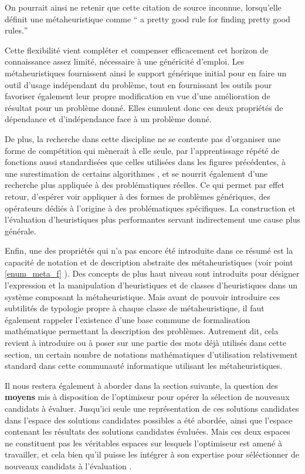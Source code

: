 On pourrait ainsi ne retenir que cette citation de source inconnue, lorsqu'elle définit une métaheuristique comme \foreignquote{english}{ a pretty good rule for finding pretty good rules.}

Cette flexibilité vient compléter et compenser efficacement cet horizon de connaissance assez limité, nécessaire à une généricité d'emploi. Les métaheuristiques fournissent ainsi le support générique initial pour en faire un outil d'usage indépendant du problème, tout en fournissant les outils pour favoriser également leur propre modification en vue d'une amélioration de résultat pour un problème donné. Elles cumulent donc ces deux propriétés de dépendance et d'indépendance face à un problème donné.

De plus, la recherche dans cette discipline ne se contente pas d'organiser une forme de compétition qui mènerait à elle seule, par l'apprentissage répété de fonctions aussi standardisées que celles utilisées dans les figures précédentes, à une surestimation de certains algorithmes , et se nourrit également d'une recherche plus appliquée à des problématiques réelles. Ce qui permet par effet retour, d'espérer voir appliquer à des formes de problèmes génériques, des opérateurs dédiés à l'origine à des problématiques spécifiques. La construction et l'évaluation d'heuristiques plus performantes servant indirectement une cause plus générale.

Enfin, une des propriétés qui n'a pas encore été introduite dans ce résumé est la capacité de notation et de description abstraite des métaheuristiques (voir point \ref{enum_meta_f} ). Des concepts de plus haut niveau sont introduits pour désigner l'expression et la manipulation d'heuristiques et de classes d'heuristiques dans un système composant la métaheuristique. Mais avant de pouvoir introduire ces subtilités de typologie propre à chaque classe de métaheuristique, il faut également rappeler l'existence d'une base commune de formalisation mathématique permettant la description des problèmes. Autrement dit, cela revient à introduire ou à poser sur une partie des mots déjà utilisés dans cette section, un certain nombre de notations mathématiques d'utilisation relativement standard dans cette communauté informatique utilisant les métaheuristiques.

Il nous restera également à aborder dans la section suivante, la question des \textbf{moyens} mis à disposition de l'optimiseur pour opérer la sélection de nouveaux candidats à évaluer. Jusqu'ici seule une représentation de ces solutions candidates dans l'espace des solutions candidates possibles a été abordée, ainsi que l'espace contenant les résultats des solutions candidates évaluées. Mais ces deux espaces ne constituent pas les véritables espaces sur lesquels l'optimiseur est amené à travailler, et cela bien qu'il puisse les intégrer à son expertise pour séléctionner de nouveaux candidats à l'évaluation .


